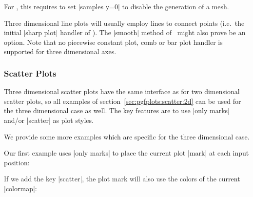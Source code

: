 For , this requires to set |samples y=0| to disable the generation of a mesh.
\begin{codeexample}[]
\end{codeexample}

Three dimensional line plots will usually employ lines to connect points (i.e.\ the initial |sharp plot| handler of \Tikz). The |smooth| method of \Tikz\ might also prove be an option. Note that no piecewise constant plot, comb or bar plot handler is supported for three dimensional axes.

\subsubsection{Scatter Plots}

Three dimensional scatter plots have the same interface as for two dimensional scatter plots, so all examples of section~\ref{sec:pgfplots:scatter:2d} can be used for the three dimensional case as well. 
The key features are to use |only marks| and/or |scatter| as plot styles. 

We provide some more examples which are specific for the three dimensional case.

Our first example uses |only marks| to place the current plot |mark| at each input position:
\pgfplotsexpensiveexample
\begin{codeexample}[]
\end{codeexample}

If we add the key |scatter|, the plot mark will also use the colors of the current |colormap|:
\pgfplotsexpensiveexample
\begin{codeexample}[]
\end{codeexample}

